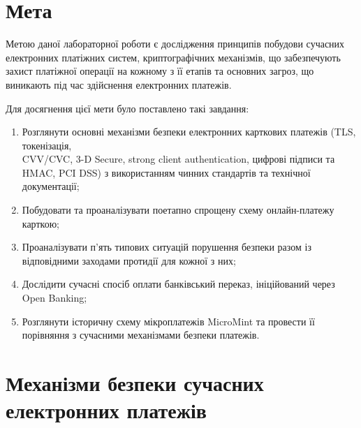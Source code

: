 \section{Мета}
\label{sec:objective}
Метою даної лабораторної роботи є дослідження принципів побудови сучасних електронних платіжних систем, 
криптографічних механізмів, що забезпечують захист платіжної операції на кожному з її етапів та основних загроз, 
що виникають під час здійснення електронних платежів.

Для досягнення цієї мети було поставлено такі завдання:
\begin{enumerate}[noitemsep]
    \item Розглянути основні механізми безпеки електронних карткових платежів (TLS, токенізація, \\ CVV/CVC, 3-D 
        Secure, strong client authentication, цифрові підписи та HMAC, PCI DSS) з використанням чинних стандартів та технічної документації;
    \item Побудовати та проаналізувати поетапно спрощену схему онлайн-платежу карткою;
    \item Проаналізувати п'ять типових ситуацій порушення безпеки разом із відповідними заходами протидії для 
        кожної з них;
    \item Дослідити сучасні спосіб оплати банківський переказ, ініційований через Open Banking;
    \item Розглянути історичну схему мікроплатежів MicroMint та провести її порівняння з сучасними механізмами 
        безпеки платежів.
\end{enumerate}


\section{Механізми безпеки сучасних електронних платежів}
\label{sec:questions}



